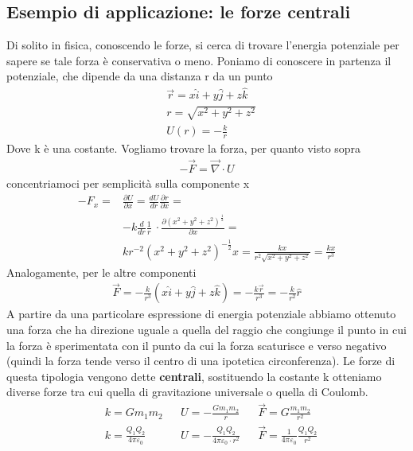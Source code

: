 \subsection{Esempio di applicazione: le forze centrali}\label{sec:forzecentrali}
Di solito in fisica, conoscendo le forze, si cerca di trovare l'energia potenziale per sapere se tale forza è conservativa o meno. Poniamo di conoscere in partenza il potenziale, che dipende da una distanza r da un punto
\begin{align*}
&\vec{r} = x \hat{i} + y \hat{j} + z \hat{k}\\
&r = \sqrt{x^2+y^2+z^2}\\
&U(r) = -\frac{k}{r}
\end{align*}
Dove k è una costante. Vogliamo trovare la forza, per quanto visto sopra
\begin{align*}
-\vec{F} = \vec{\nabla} \cdot U
\end{align*}
concentriamoci per semplicità sulla componente x
\begin{align*}
-F_x =& \frac{\partial U}{\partial x} =  \frac{d U}{d r}  \frac{\partial r}{\partial x}=\\
&-k \frac{d}{d r}\frac{1}{r}\ \cdot \frac{\partial (x^2+y^2+z^2)^{\frac{1}{2}}}{\partial x} =\\
&kr^{-2} (x^2+y^2+z^2)^{-\frac{1}{2}} x = \frac{kx}{r^2 \sqrt{x^2+y^2+z^2}}= \frac{kx}{r^3}
\end{align*}
Analogamente, per le altre componenti
\begin{align*}
	\vec{F}= -\frac{k}{r^3}(x \hat{i} + y \hat{j} + z \hat{k})=-\frac{k\vec{r}}{r^3} = -\frac{k}{r^2}\hat{r}
\end{align*}
A partire da una particolare espressione di energia potenziale abbiamo ottenuto una forza che ha direzione uguale a quella del raggio che congiunge il punto in cui la forza è sperimentata con il punto da cui la forza scaturisce e verso negativo (quindi la forza tende verso il centro di una ipotetica circonferenza). Le forze di questa tipologia vengono dette \textbf{centrali}, sostituendo la costante k otteniamo diverse forze tra cui quella di gravitazione universale o quella di Coulomb.
\begin{align*}
	&k = G m_1 m_2 && U = -\frac{G m_1 m_2}{r} && \vec{F} = G\frac{m_1 m_2}{r^2}\\
	&k = \frac{Q_1 Q_2}{4 \pi \varepsilon_0} && U =-\frac{Q_1 Q_2}{4 \pi \varepsilon_0\cdot r^2} &&\vec{F} = \frac{1}{4 \pi \varepsilon_0}\frac{Q_1 Q_2}{r^2}
\end{align*}
